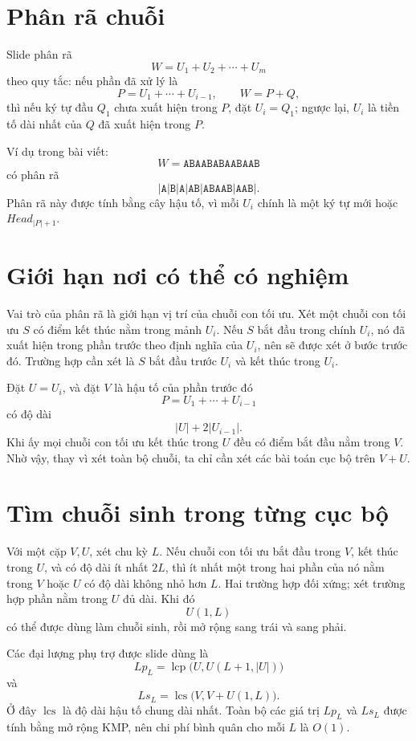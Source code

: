 \documentclass[11pt]{article}
\begin{document}
\section{Phân rã chuỗi}

Slide phân rã
\[
  W=U_1+U_2+\cdots+U_m
\]
theo quy tắc: nếu phần đã xử lý là
\[
  P=U_1+\cdots+U_{i-1},\qquad W=P+Q,
\]
thì nếu ký tự đầu \(Q_1\) chưa xuất hiện trong \(P\), đặt \(U_i=Q_1\); ngược
lại, \(U_i\) là tiền tố dài nhất của \(Q\) đã xuất hiện trong \(P\).

Ví dụ trong bài viết:
\[
  W=\texttt{ABAABABAABAAB}
\]
có phân rã
\[
  \texttt{|A|B|A|AB|ABAAB|AAB|}.
\]
Phân rã này được tính bằng cây hậu tố, vì mỗi \(U_i\) chính là một ký tự mới
hoặc \(\mathit{Head}_{|P|+1}\).

\section{Giới hạn nơi có thể có nghiệm}

Vai trò của phân rã là giới hạn vị trí của chuỗi con tối ưu. Xét một chuỗi
con tối ưu \(S\) có điểm kết thúc nằm trong mảnh \(U_i\). Nếu \(S\) bắt đầu
trong chính \(U_i\), nó đã xuất hiện trong phần trước theo định nghĩa của
\(U_i\), nên sẽ được xét ở bước trước đó. Trường hợp cần xét là \(S\) bắt đầu
trước \(U_i\) và kết thúc trong \(U_i\).

Đặt \(U=U_i\), và đặt \(V\) là hậu tố của phần trước đó
\[
  P=U_1+\cdots+U_{i-1}
\]
có độ dài
\[
  |U|+2|U_{i-1}|.
\]
Khi ấy mọi chuỗi con tối ưu kết thúc trong \(U\) đều có điểm bắt đầu nằm
trong \(V\). Nhờ vậy, thay vì xét toàn bộ chuỗi, ta chỉ cần xét các bài toán
cục bộ trên \(V+U\).

\section{Tìm chuỗi sinh trong từng cục bộ}

Với một cặp \(V,U\), xét chu kỳ \(L\). Nếu chuỗi con tối ưu bắt đầu trong
\(V\), kết thúc trong \(U\), và có độ dài ít nhất \(2L\), thì ít nhất một
trong hai phần của nó nằm trong \(V\) hoặc \(U\) có độ dài không nhỏ hơn
\(L\). Hai trường hợp đối xứng; xét trường hợp phần nằm trong \(U\) đủ dài.
Khi đó
\[
  U(1,L)
\]
có thể được dùng làm chuỗi sinh, rồi mở rộng sang trái và sang phải.

Các đại lượng phụ trợ được slide dùng là
\[
  \mathit{Lp}_L=\operatorname{lcp}\bigl(U,U(L+1,|U|)\bigr)
\]
và
\[
  \mathit{Ls}_L=\operatorname{lcs}\bigl(V,V+U(1,L)\bigr).
\]
Ở đây \(\operatorname{lcs}\) là độ dài hậu tố chung dài nhất. Toàn bộ các
giá trị \(\mathit{Lp}_L\) và \(\mathit{Ls}_L\) được tính bằng mở rộng KMP, nên
chi phí bình quân cho mỗi \(L\) là \(O(1)\).
\end{document}
